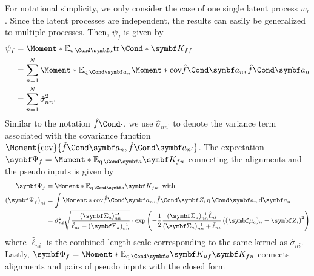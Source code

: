 For notational simplicity, we only consider the case of one single latent process $w_r$.
Since the latent processes are independent, the results can easily be generalized to multiple processes.
Then, $\psi_f$ is given by
\begin{equation}
    \begin{split}
        \psi_f &= \Moment*{\E_{\Variat{\rv{a}}}}{\Fun*{\tr}{\mat{K_{ff}}}} \\
        &= \sum_{n=1}^N \Moment*{\E_{\Variat{\rv{a}_n}}}{\Moment*{\cov}{\Fun{\hat{f}}{\mat{a}_n}, \Fun{\hat{f}}{\mat{a}_n}}} \\
        &= \sum_{n=1}^N \hat{\sigma}_{nn}^2.
    \end{split}
\end{equation}
Similar to the notation $\Fun{\hat{f}}{\cdot}$, we use $\hat{\sigma}_{nn^\prime}$ to denote the variance term associated with the covariance function $\Moment{\cov}{\Fun{\hat{f}}{\mat{a}_n}, \Fun{\hat{f}}{\mat{a}_{n^\prime}}}$.
The expectation $\mat{\Psi_f} = \Moment*{\E_{\Variat{\rv{a}}}}{\mat{K_{fu}}}$ connecting the alignments and the pseudo inputs is given by
\begin{equation}
    \begin{split}
        \mat{\Psi_f} &= \Moment*{\E_{\Variat{\rv{a}}}}{\mat{K_{fu}}}\text{, with} \\
        \left( \mat{\Psi_f} \right)_{ni}
        &= \int \Moment*{\cov}{\Fun{\hat{f}}{\mat{a}_n}, \Fun{\hat{f}}{\mat{Z}_i}} \Variat{\rv{a}_n} \diff \rv{a}_n \\
        &= \hat{\sigma}_{ni}^2 \sqrt{\frac{(\mat{\Sigma}_a)_{nn}\inv}{\hat{\ell}_{ni} + (\mat{\Sigma}_a)_{nn}\inv}}
        \cdot \exp\left(-\frac{1}{2} \frac{(\mat{\Sigma}_a)_{nn}\inv\hat{\ell}_{ni}}{(\mat{\Sigma}_a)_{nn}\inv + \hat{\ell}_{ni}} \left((\mat{\mu}_a)_n - \mat{Z}_i\right)^2\right)
    \end{split}
\end{equation}
where $\hat{\ell}_{ni}$ is the combined length scale corresponding to the same kernel as $\hat{\sigma}_{ni}$.
Lastly, $\mat{\Phi_f} = \Moment*{\E_{\Variat{\rv{a}}}}{\mat{K_{uf}}\mat{K_{fu}}}$ connects alignments and pairs of pseudo inputs with the closed form
